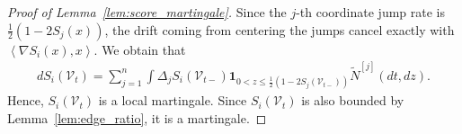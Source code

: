 \documentclass[11pt]{article}
\newcommand{\rV}{\mathscr{V}}
\newcommand{\wNj}{\widetilde{N}^{[j]}}
\theoremstyle{named}
\theoremstyle{plain}
\newcommand{\parenth}[1]{\left( #1 \right)}
\newcommand{\angles}[1]{\left\langle #1 \right \rangle}
\begin{document}
\begin{proof}[Proof of Lemma~\ref{lem:score_martingale}]
  Since the $j$-th coordinate jump rate is $\frac12\parenth{1-2S_j(x)}$, the drift coming from centering the jumps cancel exactly with $\angles{\nabla S_i(x), x}$. We obtain that
  \begin{align*}
    dS_i(\rV_t) = \sum_{j=1}^n \int \Delta_j S_i(\rV_{t-}) \mathbf{1}_{0 < z \leq \frac{1}{2}(1-2S_j(\rV_{t-}))} \wNj(dt, dz). 
  \end{align*}
  Hence, $S_i(\rV_t)$ is a local martingale. Since $S_i(\rV_t)$ is also bounded by Lemma~\ref{lem:edge_ratio}, it is a martingale. 
\end{proof}
\end{document}

